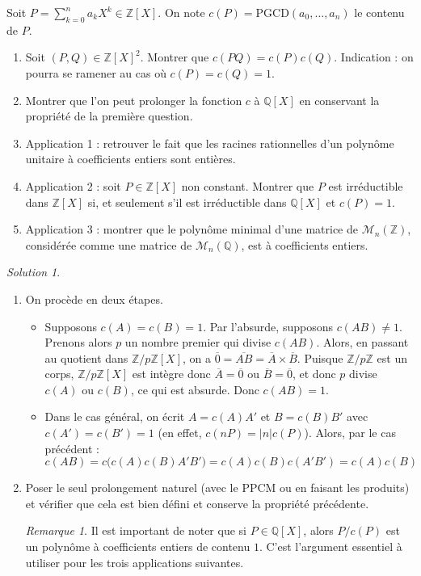 \documentclass[french]{book}
\newcommand{\Z}{\mathbb{Z}}
\newcommand{\Q}{\mathbb{Q}}
\theoremstyle{definition}
\theoremstyle{remark}
\newtheorem*{sol}{Solution}
\newtheorem*{rmq}{Remarque}
\begin{document}
\begin{exo}[2]{}
	Soit $P=\displaystyle\sum_{k=0}^{n}a_kX^k\in\Z[X]$. On note $c(P)=\text{PGCD}(a_0,\ldots,a_n)$ le contenu de $P$.
	\begin{enumerate}
		\item Soit $(P,Q)\in\Z[X]^2$. Montrer que $c(PQ)=c(P)c(Q)$. Indication : on pourra se ramener au cas où $c(P)=c(Q)=1$.
		\item Montrer que l'on peut prolonger la fonction $c$ à $\Q[X]$ en conservant la propriété de la première question.
		\item Application 1 : retrouver le fait que les racines rationnelles d'un polynôme unitaire à coefficients entiers sont entières.
		\item Application 2 : soit $P\in\Z[X]$ non constant. Montrer que $P$ est irréductible dans $\Z[X]$ si, et seulement s'il est irréductible dans $\Q[X]$ et $c(P)=1$.
		\item Application 3 : montrer que le polynôme minimal d'une matrice de $\mathcal{M}_n(\Z)$, considérée comme une matrice de $\mathcal{M}_n(\Q)$, est à coefficients entiers.
	\end{enumerate}
\end{exo}
\begin{sol}
	\begin{enumerate}
		\item On procède en deux étapes.
		\begin{itemize}
			\item Supposons $c(A)=c(B)=1$. Par l'absurde, supposons $c(AB)\ne 1$. Prenons alors $p$ un nombre premier qui divise $c(AB)$. Alors, en passant au quotient dans $\Z/p\Z[X]$, on a $\overline{0}=\overline{AB}=\overline{A}\times\overline{B}$. Puisque $\Z/p\Z$ est un corps, $\Z/p\Z[X]$ est intègre donc $\overline{A}=\overline{0}$ ou $\overline{B}=\overline{0}$, et donc $p$ divise $c(A)$ ou $c(B)$, ce qui est absurde. Donc $c(AB)=1$.
			\item Dans le cas général, on écrit $A=c(A)A'$ et $B=c(B)B'$ avec $c(A')=c(B')=1$ (en effet, $c(nP)=\lvert n\rvert c(P)$). Alors, par le cas précédent : $$c(AB)=c\big(c(A)c(B)A'B'\big)=c(A)c(B)c(A'B')=c(A)c(B)$$
		\end{itemize}
		\item Poser le seul prolongement naturel (avec le PPCM ou en faisant les produits) et vérifier que cela est bien défini et conserve la propriété précédente.
		\begin{rmq}
			Il est important de noter que si $P\in\Q[X]$, alors $P/c(P)$ est un polynôme à coefficients entiers de contenu $1$. C'est l'argument essentiel à utiliser pour les trois applications suivantes.
		\end{rmq}
	\end{enumerate}
\end{sol}
\end{document}
